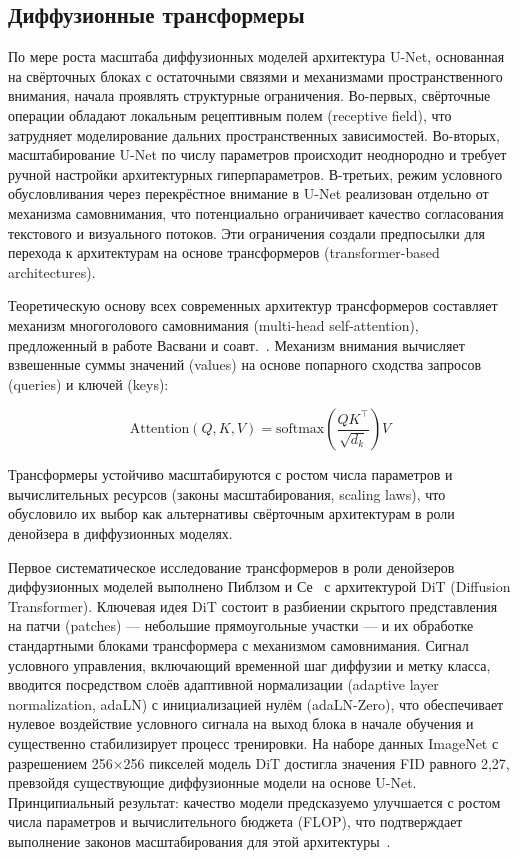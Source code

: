 \subsection{Диффузионные трансформеры}

По мере роста масштаба диффузионных моделей архитектура U-Net, основанная на свёрточных блоках с остаточными связями и механизмами пространственного внимания, начала проявлять структурные ограничения. Во-первых, свёрточные операции обладают локальным рецептивным полем (receptive field), что затрудняет моделирование дальних пространственных зависимостей. Во-вторых, масштабирование U-Net по числу параметров происходит неоднородно и требует ручной настройки архитектурных гиперпараметров. В-третьих, режим условного обусловливания через перекрёстное внимание в U-Net реализован отдельно от механизма самовнимания, что потенциально ограничивает качество согласования текстового и визуального потоков. Эти ограничения создали предпосылки для перехода к архитектурам на основе трансформеров (transformer-based architectures).

Теоретическую основу всех современных архитектур трансформеров составляет механизм многоголового самовнимания (multi-head self-attention), предложенный в работе Васвани и соавт.~\cite{vaswani2017attention}. Механизм внимания вычисляет взвешенные суммы значений (values) на основе попарного сходства запросов (queries) и ключей (keys):

\begin{equation}
    \text{Attention}(Q, K, V) = \text{softmax}\!\left(\frac{QK^\top}{\sqrt{d_k}}\right) V
    \label{eq:attention}
\end{equation}

Трансформеры устойчиво масштабируются с ростом числа параметров и вычислительных ресурсов (законы масштабирования, scaling laws), что обусловило их выбор как альтернативы свёрточным архитектурам в роли денойзера в диффузионных моделях.

Первое систематическое исследование трансформеров в роли денойзеров диффузионных моделей выполнено Пиблзом и Се~\cite{peebles2023dit} с архитектурой DiT (Diffusion Transformer). Ключевая идея DiT состоит в разбиении скрытого представления на патчи (patches) --- небольшие прямоугольные участки --- и их обработке стандартными блоками трансформера с механизмом самовнимания. Сигнал условного управления, включающий временной шаг диффузии и метку класса, вводится посредством слоёв адаптивной нормализации (adaptive layer normalization, adaLN) с инициализацией нулём (adaLN-Zero), что обеспечивает нулевое воздействие условного сигнала на выход блока в начале обучения и существенно стабилизирует процесс тренировки. На наборе данных ImageNet с разрешением 256×256 пикселей модель DiT достигла значения FID равного 2,27, превзойдя существующие диффузионные модели на основе U-Net. Принципиальный результат: качество модели предсказуемо улучшается с ростом числа параметров и вычислительного бюджета (FLOP), что подтверждает выполнение законов масштабирования для этой архитектуры~\cite{peebles2023dit}.

